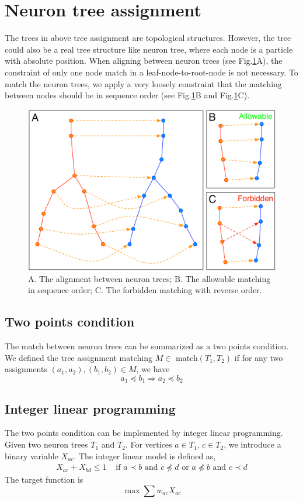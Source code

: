 \section{Neuron tree assignment}
The trees in above tree assignment are topological structures. However, the tree could also be a real tree structure like neuron tree, where each node is a particle with absolute position. When aligning between neuron trees (see Fig.\ref{fig:treeassign-nt}A), the constraint of only one node match in a leaf-node-to-root-node is not necessary. To match the neuron trees, we apply a very loosely constraint that the matching between nodes should be in sequence order (see Fig.\ref{fig:treeassign-nt}B and Fig.\ref{fig:treeassign-nt}C). 

\begin{figure}[htbp]
\centering
\includegraphics[width=1.0\textwidth]{images/treeassign_nt}
\caption[The alignment between neuron trees]{A. The alignment between neuron trees; B. The allowable matching in sequence order; C. The forbidden matching with reverse order.}
\label{fig:treeassign-nt}
\end{figure}

\subsection{Two points condition}
The match between neuron trees can be summarized as a two points condition. We defined the tree assignment matching $M \in$ match$(T_1,T_2)$ if for any two assignments $(a_1,a_2),(b_1,b_2) \in M$, we have
$$
a_1 \preceq b_1 \Rightarrow a_2 \preceq b_2
$$

\subsection{Integer linear programming}
The two points condition can be implemented by integer linear programming. Given two neuron trees $T_1$ and $T_2$. For vertices $a\in T_1$, $c\in T_2$, we introduce a binary variable $X_{ac}$. The integer linear model is defined as,
\begin{eqnarray}
X_{ac} + X_{bd} \le 1  & \mbox{ if } a \prec b \mbox{ and } c \not\preceq d \mbox{ or } a \not\preceq b \mbox{ and } c \prec d
\end{eqnarray}
The target function is
$$
\max\sum w_{ac} X_{ac}
$$
